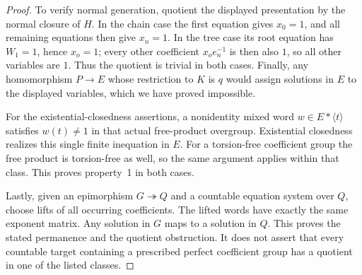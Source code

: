 \begin{proof}
To verify normal generation, quotient the displayed
presentation by the normal closure of $H$. In the chain
case the first equation gives $x_0=1$, and all remaining
equations then give $x_n=1$. In the tree case its root
equation has $W_1=1$, hence $x_o=1$; every other coefficient
$x_oe_n^{-1}$ is then also $1$, so all other variables are
$1$. Thus the quotient is trivial in both cases. Finally,
any homomorphism $P\to E$ whose restriction to $K$ is $q$
would assign solutions in
$E$ to the displayed variables, which we have proved
impossible.

For the existential-closedness assertions, a nonidentity
mixed word $w\in E*\langle t\rangle$ satisfies $w(t)\ne1$
in that actual free-product overgroup. Existential
closedness realizes this single finite inequation in $E$.
For a torsion-free coefficient group the free product is
torsion-free as well, so the same argument applies within
that class. This proves property~1 in both cases.

Lastly, given an epimorphism $G\twoheadrightarrow Q$ and
a countable equation system over $Q$, choose lifts of all
occurring coefficients. The lifted words have exactly the
same exponent matrix. Any solution in $G$ maps to a
solution in $Q$. This proves the stated permanence and the
quotient obstruction. It does not assert that every
countable target containing a prescribed perfect coefficient
group has a quotient in one of the listed classes.
\end{proof}
